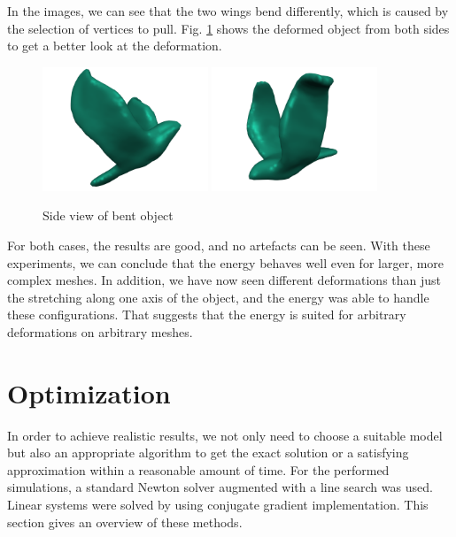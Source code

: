 In the images, we can see that the two wings bend differently, which is caused by the selection of vertices to pull. Fig. \ref{fig:bird_deformed_bend_side} shows the deformed object from both sides to get a better look at the deformation.
\begin{figure}[!htbp]
	\centering
    \includegraphics[width=0.44\textwidth]{resources/bent_side2.png}
    \hfill
    \includegraphics[width=0.44\textwidth]{resources/bent_side1.png} 
    \caption{Side view of bent object}
    \label{fig:bird_deformed_bend_side}
\end{figure}

For both cases, the results are good, and no artefacts can be seen. With these experiments, we can conclude that the energy behaves well even for larger, more complex meshes. In addition, we have now seen different deformations than just the stretching along one axis of the object, and the energy was able to handle these configurations. That suggests that the energy is suited for arbitrary deformations on arbitrary meshes.

\section{Optimization}
\label{s:optimization}
In order to achieve realistic results, we not only need to choose a suitable model but also an appropriate algorithm to get the exact solution or a satisfying approximation within a reasonable amount of time. For the performed simulations, a standard Newton solver augmented with a line search was used. Linear systems were solved by using conjugate gradient implementation. This section gives an overview of these methods.

